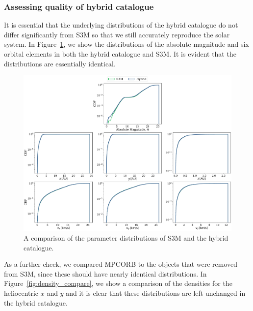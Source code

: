 \documentclass[twocolumn, twocolappendix]{aastex631}
\begin{document}
\subsubsection{Assessing quality of hybrid catalogue}
It is essential that the underlying distributions of the hybrid catalogue do not differ significantly from S3M so that we still accurately reproduce the solar system. In Figure~\ref{fig:hybrid_vs_s3m_dists}, we show the distributions of the absolute magnitude and six orbital elements in both the hybrid catalogue and S3M. It is evident that the distributions are essentially identical.

\begin{figure}[htb]
    \centering
    \includegraphics[width=\textwidth]{hybrid_vs_s3m_distributions.pdf}
    \caption{A comparison of the parameter distributions of S3M and the hybrid catalogue.}
    \label{fig:hybrid_vs_s3m_dists}
\end{figure}

As a further check, we compared MPCORB to the objects that were removed from S3M, since these should have nearly identical distributions. In Figure~\ref{fig:density_compare}, we show a comparison of the densities for the heliocentric $x$ and $y$ and it is clear that these distributions are left unchanged in the hybrid catalogue.
\end{document}
